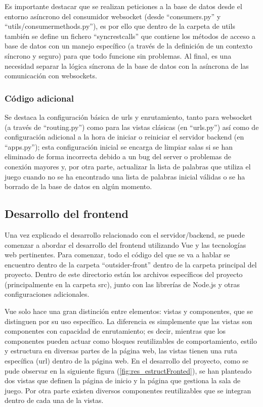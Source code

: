 Es importante destacar que se realizan peticiones a la base de datos desde el entorno asíncrono del consumidor websocket (desde ``consumers.py'' 
y ``utils/consumer\textunderscore methods.py''), es por ello que dentro de la carpeta de utils también se define un fichero ``sync\textunderscore rest\textunderscore calls'' que contiene 
los métodos de acceso a base de datos con un manejo específico (a través de la definición de un contexto síncrono y seguro) para que todo funcione sin problemas. Al final, es una necesidad
separar la lógica síncrona de la base de datos con la asíncrona de las comunicación con websockets.
	
\subsubsection{Código adicional}
Se destaca la configuración básica de urls y enrutamiento, tanto para websocket (a través de ``routing.py'') como para las vistas clásicas (en ``urls.py'') así como de 
configuración adicional a la hora de iniciar o reiniciar el servidor backend (en ``apps.py''); esta configuración inicial se encarga de limpiar salas si se han eliminado 
de forma incorrecta debido a un bug del server o problemas de conexión mayores y, por otra parte, actualizar la lista de palabras que utiliza el juego cuando no se ha encontrado
una lista de palabras inicial válidas o se ha borrado de la base de datos en algún momento.

\subsection{Desarrollo del frontend} \label{Desarrollo del frontend}

Una vez explicado el desarrollo relacionado con el servidor/backend, se puede comenzar a abordar el desarrollo del frontend utilizando Vue
y las tecnologías web pertinentes. Para comenzar, todo el código del que se va a hablar se encuentro dentro de la carpeta ``outsider-front'' dentro de la carpeta
principal del proyecto. Dentro de este directorio están los archivos específicos del proyecto (principalmente en la carpeta src), junto con las librerías de Node.js y otras 
configuraciones adicionales.

Vue solo hace una gran distinción entre elementos: vistas y componentes, que se distinguen por su uso específico. La diferencia es simplemente que 
las vistas son componentes con capacidad de enrutamiento; es decir, mientras que los componentes pueden actuar como bloques reutilizables de comportamiento, estilo 
y estructura en diversas partes de la página web, las vistas tienen una ruta específica (url) dentro de la página web. En el desarrollo del proyecto, como se pude observar 
en la siguiente figura (\ref{fig:res_estructFronted}), se han planteado dos vistas que definen la página de inicio y la página que gestiona la sala de juego. Por otra parte
existen diversos componentes reutilizables que se integran dentro de cada una de la vistas.


